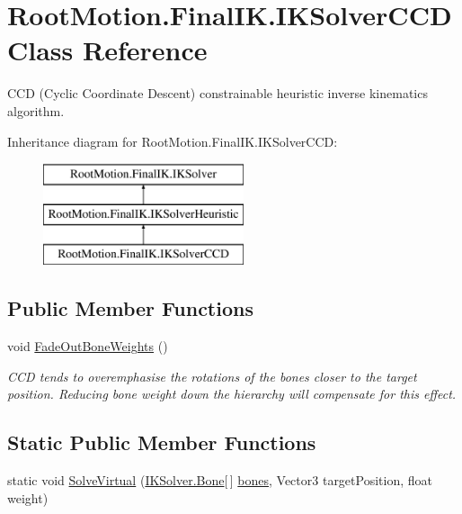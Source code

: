 \hypertarget{class_root_motion_1_1_final_i_k_1_1_i_k_solver_c_c_d}{}\section{Root\+Motion.\+Final\+I\+K.\+I\+K\+Solver\+C\+CD Class Reference}
\label{class_root_motion_1_1_final_i_k_1_1_i_k_solver_c_c_d}


C\+CD (Cyclic Coordinate Descent) constrainable heuristic inverse kinematics algorithm.  


Inheritance diagram for Root\+Motion.\+Final\+I\+K.\+I\+K\+Solver\+C\+CD\+:\begin{figure}[H]
\begin{center}
\leavevmode
\includegraphics[height=3.000000cm]{class_root_motion_1_1_final_i_k_1_1_i_k_solver_c_c_d}
\end{center}
\end{figure}
\subsection*{Public Member Functions}
\begin{DoxyCompactItemize}
\item 
void \mbox{\hyperlink{class_root_motion_1_1_final_i_k_1_1_i_k_solver_c_c_d_a99b22c85ea89d228dc3a85b0dab23d06}{Fade\+Out\+Bone\+Weights}} ()
\begin{DoxyCompactList}\small\item\em C\+CD tends to overemphasise the rotations of the bones closer to the target position. Reducing bone weight down the hierarchy will compensate for this effect. \end{DoxyCompactList}\end{DoxyCompactItemize}
\subsection*{Static Public Member Functions}
\begin{DoxyCompactItemize}
\item 
static void \mbox{\hyperlink{class_root_motion_1_1_final_i_k_1_1_i_k_solver_c_c_d_a9816879c84a69d87e498f3c200110a0d}{Solve\+Virtual}} (\mbox{\hyperlink{class_root_motion_1_1_final_i_k_1_1_i_k_solver_1_1_bone}{I\+K\+Solver.\+Bone}}\mbox{[}$\,$\mbox{]} \mbox{\hyperlink{class_root_motion_1_1_final_i_k_1_1_i_k_solver_heuristic_af2f1ea1642dbe9276519e9bbabef2d9d}{bones}}, Vector3 target\+Position, float weight)
\end{DoxyCompactItemize}
